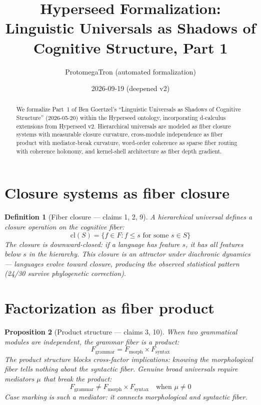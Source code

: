 \documentclass[11pt,a4paper]{article}
\title{Hyperseed Formalization:\\
  Linguistic Universals as Shadows of Cognitive Structure, Part 1}
\author{ProtomegaTron (automated formalization)}
\date{2026-09-19 (deepened v2)}
\newtheorem{definition}{Definition}[section]
\newtheorem{proposition}[definition]{Proposition}
\begin{document}
\maketitle

\begin{abstract}
We formalize Part~1 of Ben Goertzel's ``Linguistic Universals as Shadows
of Cognitive Structure'' (2026-05-20) within the Hyperseed ontology,
incorporating d-calculus extensions from Hyperseed v2. Hierarchical
universals are modeled as fiber closure systems with measurable closure
curvature, cross-module independence as fiber product with mediator-break
curvature, word-order coherence as sparse fiber routing with coherence
holonomy, and kernel-shell architecture as fiber depth gradient.
\end{abstract}

\tableofcontents

\section{Closure systems as fiber closure}

\begin{definition}[Fiber closure --- claims 1, 2, 9]
A \emph{hierarchical universal} defines a closure operation on the
cognitive fiber:
\[
  \text{cl}(S) = \{f \in F : f \leq s \text{ for some } s \in S\}
\]
The closure is downward-closed: if a language has feature $s$, it has
all features below $s$ in the hierarchy. This closure is an attractor
under diachronic dynamics --- languages evolve toward closure, producing
the observed statistical pattern (24/30 survive phylogenetic correction).
\end{definition}

\section{Factorization as fiber product}

\begin{proposition}[Product structure --- claims 3, 10]
\label{prop:product}
When two grammatical modules are independent, the grammar fiber is a
product:
\[
  F_{\text{grammar}} = F_{\text{morph}} \times F_{\text{syntax}}
\]
The product structure blocks cross-factor implications: knowing the
morphological fiber tells nothing about the syntactic fiber. Genuine
broad universals require mediators $\mu$ that break the product:
\[
  F_{\text{grammar}} \neq F_{\text{morph}} \times F_{\text{syntax}}
  \quad \text{when } \mu \neq 0
\]
Case marking is such a mediator: it connects morphological and
syntactic fiber.
\end{proposition}
\end{document}
